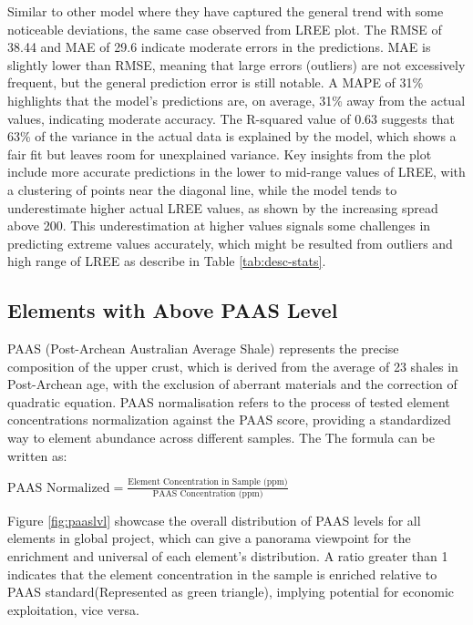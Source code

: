 \documentclass[11pt,a4paper,]{article}
\begin{document}
Similar to other model where they have captured the general trend with some noticeable deviations, the same case observed from LREE plot. The RMSE of 38.44 and MAE of 29.6 indicate moderate errors in the predictions. MAE is slightly lower than RMSE, meaning that large errors (outliers) are not excessively frequent, but the general prediction error is still notable. A MAPE of 31\% highlights that the model's predictions are, on average, 31\% away from the actual values, indicating moderate accuracy. The R-squared value of 0.63 suggests that 63\% of the variance in the actual data is explained by the model, which shows a fair fit but leaves room for unexplained variance. Key insights from the plot include more accurate predictions in the lower to mid-range values of LREE, with a clustering of points near the diagonal line, while the model tends to underestimate higher actual LREE values, as shown by the increasing spread above 200. This underestimation at higher values signals some challenges in predicting extreme values accurately, which might be resulted from outliers and high range of LREE as describe in Table \ref{tab:desc-stats}.

\subsection{Elements with Above PAAS Level}\label{elements-with-above-paas-level-1}

PAAS (Post-Archean Australian Average Shale) represents the precise composition of the upper crust, which is derived from the average of 23 shales in Post-Archean age, with the exclusion of aberrant materials and the correction of quadratic equation. \autocite{McLennan1989} PAAS normalisation refers to the process of tested element concentrations normalization against the PAAS score, providing a standardized way to element abundance across different samples. The The formula can be written as:

\(\text{PAAS Normalized}=\frac{ \text{Element Concentration in Sample (ppm)}}{\text{PAAS Concentration (ppm)}}\)

Figure \ref{fig:paaslvl} showcase the overall distribution of PAAS levels for all elements in global project, which can give a panorama viewpoint for the enrichment and universal of each element's distribution. A ratio greater than 1 indicates that the element concentration in the sample is enriched relative to PAAS standard(Represented as green triangle), implying potential for economic exploitation, vice versa.
\end{document}
